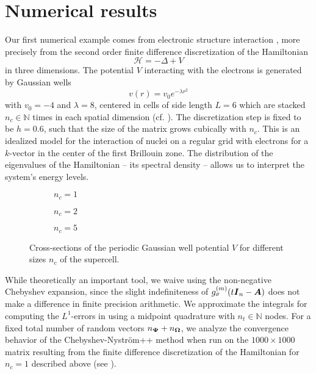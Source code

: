 \documentclass[12pt]{article}
\begin{document}
\section{Numerical results}
\label{sec:results}

Our first numerical example comes from electronic structure interaction \cite{lin-2017-randomized-estimation}, more precisely from the second order finite difference discretization of the Hamiltonian
\begin{equation}
    \mathcal{H} = - \Delta + V
    \label{equ:5-experiments-electronic-hamiltonian}
\end{equation}
in three dimensions. The potential $V$ interacting with the electrons is generated by Gaussian wells
\begin{equation}
    v(r) = v_0 e^{-\lambda r^2}
    \label{equ:5-experiments-gaussian-cell}
\end{equation}
with $v_0 = -4$ and $\lambda = 8$, centered in cells of side length $L=6$ which are stacked $n_c \in \mathbb{N}$ times in each spatial dimension (cf. ). The discretization step is fixed to be $h=0.6$, such that the size of the matrix grows cubically with $n_c$. This is an idealized model for the interaction of nuclei on a regular grid with electrons for a $k$-vector in the center of the first Brillouin zone. The distribution of the eigenvalues of the Hamiltonian -- its spectral density -- allows us to interpret the system's energy levels.

\begin{figure}[ht]
    \begin{subfigure}[b]{0.32\columnwidth}
        
        \caption{$n_c=1$}
        \label{fig:gaussian-well-1}
    \end{subfigure}
    \begin{subfigure}[b]{0.32\columnwidth}
        
        \caption{$n_c=2$}
        \label{fig:gaussian-well-2}
    \end{subfigure}
    \begin{subfigure}[b]{0.32\columnwidth}
        
        \caption{$n_c=5$}
        \label{fig:gaussian-well-5}
    \end{subfigure}
    \caption{Cross-sections of the periodic Gaussian well potential $V$ for different sizes $n_c$ of the supercell.}
    \label{fig:gaussian-well}
\end{figure}

While theoretically an important tool, we waive using the non-negative Chebyshev expansion, since the slight indefiniteness of $g_{\sigma}^{(m)}(t \boldsymbol{I}_n - \boldsymbol{A})$  does not make a difference in finite precision arithmetic. We approximate the integrals for computing the $L^1$-errors in  using a midpoint quadrature with $n_t \in \mathbb{N}$ nodes. For a fixed total number of random vectors $n_{\boldsymbol{\Psi}} + n_{\boldsymbol{\Omega}}$, we analyze the convergence behavior of the Chebyshev-Nyström++ method when run on the $1000 \times 1000$ matrix resulting from the finite difference discretization of the Hamiltonian for $n_c = 1$ described above (see ). 
\end{document}
